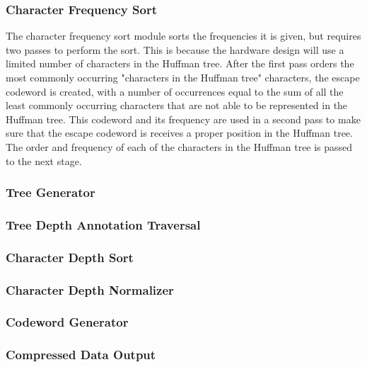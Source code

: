 \documentclass[doublespace,draft,nopageskip]{VTthesis} %
\begin{document}
\subsubsection{Character Frequency Sort}\label{sss:character_frequency_sort}
The character frequency sort module sorts the frequencies it is given, but requires two passes to perform the sort. This is because the hardware design will use a limited number of characters in the Huffman tree. After the first pass orders the most commonly occurring "characters in the Huffman tree" characters, the escape codeword is created, with a number of occurrences equal to the sum of all the least commonly occurring characters that are not able to be represented in the Huffman tree. This codeword and its frequency are used in a second pass to make sure that the escape codeword is receives a proper position in the Huffman tree. The order and frequency of each of the characters in the Huffman tree is passed to the next stage.

\subsubsection{Tree Generator}\label{sss:tree_generator}


\subsubsection{Tree Depth Annotation Traversal}\label{sss:tree_depth_counter}

\subsubsection{Character Depth Sort}\label{sss:sort}

\subsubsection{Character Depth Normalizer}\label{sss:tree_normalizer}

\subsubsection{Codeword Generator}\label{sss:codeword_generator}

\subsubsection{Compressed Data Output}\label{sss:compressor_output}
\end{document}
